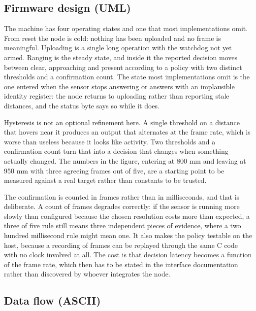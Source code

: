 \subsection*{Firmware design (UML)}


The machine has four operating states and one that most implementations omit.
From reset the node is cold: nothing has been uploaded and no frame is
meaningful. Uploading is a single long operation with the watchdog not yet
armed. Ranging is the steady state, and inside it the reported decision moves
between clear, approaching and present according to a policy with two distinct
thresholds and a confirmation count. The state most implementations omit is the
one entered when the sensor stops answering or answers with an implausible
identity register: the node returns to uploading rather than reporting stale
distances, and the status byte says so while it does.

Hysteresis is not an optional refinement here. A single threshold on a distance
that hovers near it produces an output that alternates at the frame rate, which
is worse than useless because it looks like activity. Two thresholds and a
confirmation count turn that into a decision that changes when something
actually changed. The numbers in the figure, entering at 800 mm and leaving at
950 mm with three agreeing frames out of five, are a starting point to be
measured against a real target rather than constants to be trusted.

The confirmation is counted in frames rather than in milliseconds, and that is
deliberate. A count of frames degrades correctly: if the sensor is running more
slowly than configured because the chosen resolution costs more than expected, a
three of five rule still means three independent pieces of evidence, where a two
hundred millisecond rule might mean one. It also makes the policy testable on
the host, because a recording of frames can be replayed through the same C code
with no clock involved at all. The cost is that decision latency becomes a
function of the frame rate, which then has to be stated in the interface
documentation rather than discovered by whoever integrates the node.

\subsection*{Data flow (ASCII)}

